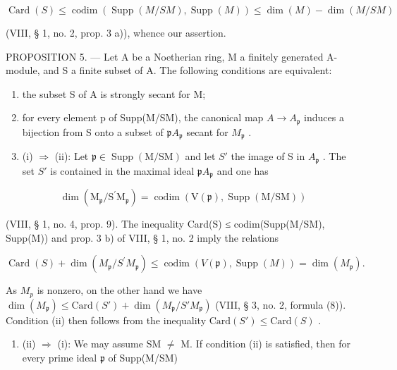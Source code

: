 \[
\operatorname{Card} (S) \leqslant \operatorname{codim} (\operatorname{Supp} (M / S M), \operatorname{Supp} (M)) \leqslant \dim (M) - \dim (M / S M)
\]

(VIII, § 1, no. 2, prop. 3 a)), whence our assertion.

PROPOSITION 5. --- Let A be a Noetherian ring, M a finitely generated A-module, and S a finite subset of A. The following conditions are equivalent:

\begin{enumerate}
\def\labelenumi{(\roman{enumi})}
\item
  the subset S of A is strongly secant for M;
\item
  for every element p of Supp(M/SM), the canonical map \(A \to A_{\mathfrak{p}}\) induces a bijection from S onto a subset of \(\mathfrak{p}A_{\mathfrak{p}}\) secant for \(M_{\mathfrak{p}}\) .
\item
  (i) \(\Rightarrow\) (ii): Let \(\mathfrak{p} \in \operatorname{Supp}(\mathrm{M} / \mathrm{SM})\) and let \(S'\) the image of S in \(A_{\mathfrak{p}}\) . The set \(S'\) is contained in the maximal ideal \(\mathfrak{p} A_{\mathfrak{p}}\) and one has
\end{enumerate}

\[
\dim (\mathrm{M} _ {\mathfrak {p}} / \mathrm{S} ^ {\prime} \mathrm{M} _ {\mathfrak {p}}) = \operatorname{codim} (\mathrm{V} (\mathfrak {p}), \operatorname{Supp} (\mathrm{M} / \mathrm{SM}))
\]

(VIII, § 1, no. 4, prop. 9). The inequality Card(S) ≤ codim(Supp(M/SM), Supp(M)) and prop. 3 b) of VIII, § 1, no. 2 imply the relations

\[
\operatorname{Card} (S) + \dim \left(M _ {\mathfrak {p}} / S ^ {\prime} M _ {\mathfrak {p}}\right) \leqslant \operatorname{codim} \left(V (\mathfrak {p}), \operatorname{Supp} (M)\right) = \dim \left(M _ {\mathfrak {p}}\right).
\]

As \(M_{p}\) is nonzero, on the other hand we have \(\dim(M_{\mathfrak{p}}) \leqslant \text{Card}(S') + \dim(M_{\mathfrak{p}}/S'M_{\mathfrak{p}})\) (VIII, § 3, no. 2, formula (8)). Condition (ii) then follows from the inequality \(\text{Card}(S') \leqslant \text{Card}(S)\) .

\begin{enumerate}
\def\labelenumi{(\roman{enumi})}
\setcounter{enumi}{1}
\tightlist
\item
  (ii) \(\Rightarrow\) (i): We may assume SM \(\neq\) M. If condition (ii) is satisfied, then for every prime ideal \(\mathfrak{p}\) of Supp(M/SM)
\end{enumerate}

